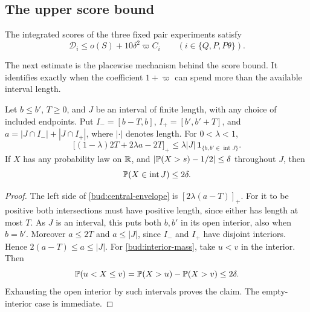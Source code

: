 \subsection{The upper score bound}

\begin{proposition}\label{bud:upper}
The integrated scores of the three fixed pair experiments satisfy
\begin{equation}\label{bud:upper-equation}
 \mathcal D_i\le o(S)+10\delta^2\varpi C_i
       \qquad(i\in\{Q,P,P\theta\}).
\end{equation}
\end{proposition}

The next estimate is the placewise mechanism behind the score
bound.  It identifies exactly when the coefficient $1+\varpi$
can spend more than the available interval length.

\begin{lemma}\label{bud:intervals}
Let $b\le b'$, $T\ge0$, and $J$ be an interval of finite length,
with any choice of included endpoints.  Put
$I_-=[b-T,b]$, $I_+=[b',b'+T]$, and
$a=|J\cap I_-|+|J\cap I_+|$, where $|\cdot|$ denotes length.
For $0<\lambda<1$,
\begin{equation}\label{bud:central-envelope}
 \big[(1-\lambda)2T+2\lambda a-2T\big]_+
 \le\lambda|J|\,
       \mathbf1_{\{b,b'\in\operatorname{int}J\}}.
\end{equation}
If $X$ has any probability law on $\mathbb R$, and
$|\mathbb P(X>s)-1/2|\le\delta$ throughout $J$, then
\begin{equation}\label{bud:interior-mass}
 \mathbb P(X\in\operatorname{int}J)\le2\delta.
\end{equation}
\end{lemma}

\begin{proof}
The left side of \eqref{bud:central-envelope} is $[2\lambda(a-T)]_+$.
For it to be positive both intersections must have positive length,
since either has length at most $T$.  As $J$ is an interval, this
puts both $b,b'$ in its open interior, also when $b=b'$.
Moreover $a\le2T$ and $a\le|J|$, since $I_-$ and $I_+$ have disjoint
interiors.  Hence $2(a-T)\le a\le|J|$.
For \eqref{bud:interior-mass}, take $u<v$ in the interior.  Then
\[
 \mathbb P(u<X\le v)=\mathbb P(X>u)-\mathbb P(X>v)\le2\delta.
\]
Exhausting the open interior by such intervals proves the claim.
The empty-interior case is immediate.
\end{proof}

